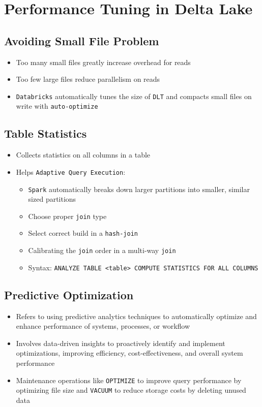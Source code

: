 \documentclass[11pt]{scrartcl}
\begin{document}
\section{Performance Tuning in Delta Lake} \label{performance_tuning_delta_lake}
\subsection{Avoiding Small File Problem}
\begin{itemize}
	\item Too many small files greatly increase overhead for reads
	\item Too few large files reduce parallelism on reads
	\item \texttt{Databricks} automatically tunes the size of \texttt{DLT} and compacts small files on write with \texttt{auto-optimize}
\end{itemize}

\subsection{Table Statistics}
\begin{itemize}
	\item Collects statistics on all columns in a table
	\item Helps \texttt{Adaptive Query Execution}:
	\begin{itemize}
		\item \texttt{Spark} automatically breaks down larger partitions into smaller, similar sized partitions
		\item Choose proper \texttt{join} type
		\item Select correct build in a \texttt{hash-join}
		\item Calibrating the \texttt{join} order in a multi-way \texttt{join}
		\item Syntax: \texttt{ANALYZE TABLE <table> COMPUTE STATISTICS FOR ALL COLUMNS}
	\end{itemize}
\end{itemize}

\subsection{Predictive Optimization}
\begin{itemize}
	\item Refers to using predictive analytics techniques to automatically optimize and enhance performance of systems, processes, or workflow
	\item Involves data-driven insights to proactively identify and implement optimizations, improving efficiency, cost-effectiveness, and overall system performance
	\item Maintenance operations like \texttt{OPTIMIZE} to improve query performance by optimizing file size and \texttt{VACUUM} to reduce storage costs by deleting unused data
\end{itemize}
\end{document}
